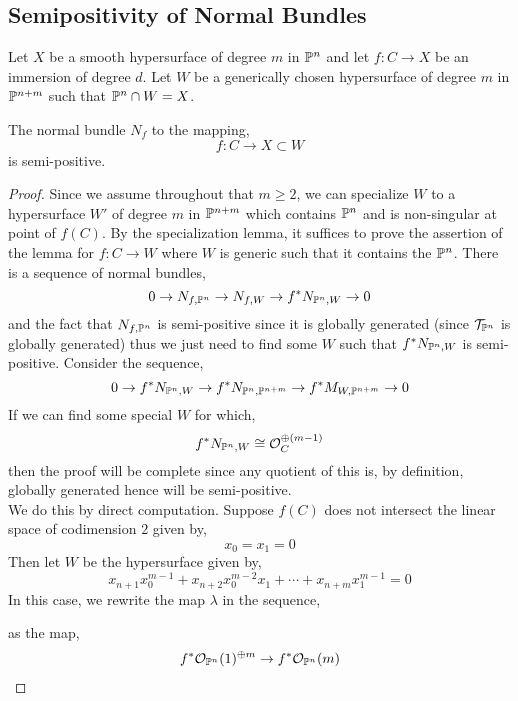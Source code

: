 \documentclass[12pt]{article}
\newcommand{\cN}{\mathcal{N}}
\begin{document}
\subsection{Semipositivity of Normal Bundles}

Let $X$ be a smooth hypersurface of degree $m$ in $\P^n$ and let $f : C \to X$ be an immersion of degree $d$. Let $W$ be a generically chosen hypersurface of degree $m$ in $\P^{n+m}$ such that $\P^n \cap W = X$. 

\begin{lemma}
The normal bundle $N_{f}$ to the mapping,
\[ f : C \to X \subset W \]
is semi-positive.
\end{lemma}

\begin{proof}
Since we assume throughout that $m \ge 2$, we can specialize $W$ to a hypersurface $W'$ of degree $m$ in $\P^{n+m}$ which contains $\P^n$ and is non-singular at point of $f(C)$. By the specialization lemma, it suffices to prove the assertion of the lemma for $f : C \to W$ where $W$ is generic such that it contains the $\P^n$. There is a sequence of normal bundles,
\[ 0 \to N_{f, \P^n} \to N_{f, W} \to f^* N_{\P^n, W} \to 0 \]
and the fact that $N_{f, \P^n}$ is semi-positive since it is globally generated (since $\T_{\P^n}$ is globally generated) thus we just need to find some $W$ such that $f^* N_{\P^n, W}$ is semi-positive. Consider the sequence,
\[ 0 \to f^* N_{\P^n, W} \to f^* N_{\P^n, \P^{n+m}} \to f^* M_{W, \P^{n+m}} \to 0 \]
If we can find some special $W$ for which,
\[ f^* N_{\P^n, W} \cong \struct{C}^{\oplus (m-1)} \]
then the proof will be complete since any quotient of this is, by definition, globally generated hence will be semi-positive.
\bigskip\\
We do this by direct computation. Suppose $f(C)$ does not intersect the linear space of codimension $2$ given by,
\[ x_0 = x_1 = 0 \]
Then let $W$ be the hypersurface given by,
\[ x_{n+1} x_0^{m-1} + x_{n+2} x_0^{m-2} x_1 + \cdots + x_{n+m} x_1^{m-1} = 0 \]
In this case, we rewrite the map $\lambda$ in the sequence,
\begin{center}
\end{center}
as the map,
\begin{align*}
f^* \struct{\P^n}(1)^{\oplus m} & \to f^* \struct{\P^n}(m) 
\\

\end{align*}
\end{proof}
\end{document}
